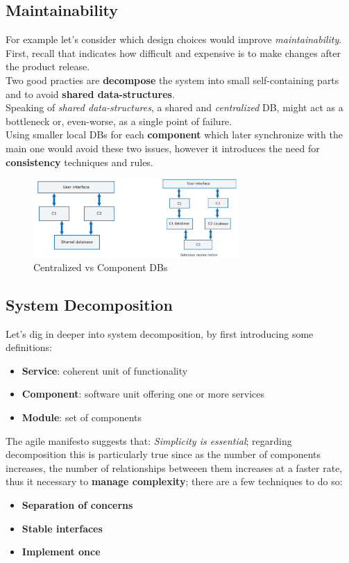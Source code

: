 \subsection{Maintainability}
For example let's consider which design choices would improve \textit{maintainability}.
First, recall that indicates how difficult and expensive is to make changes after the product release.\\
Two good practies are \textbf{decompose} the system into small self-containing parts and to avoid \textbf{shared data-structures}.\\
Speaking of \textit{shared data-structures},
a shared and \textit{centralized} DB, might act as a bottleneck or, even-worse,
as a single point of failure.\\
Using smaller local DBs for each \textbf{component} which later synchronize with the main one would avoid these two issues,
however it introduces the need for \textbf{consistency} techniques and rules.
\begin{figure}[ht]
    \centering
    \includegraphics[width=0.7\textwidth]{images/component_DBs.png}
    \caption{Centralized vs Component DBs}
\end{figure}

\subsection{System Decomposition}
Let's dig in deeper into system decomposition, by first introducing some definitions:
\begin{itemize}
    \item \textbf{Service}: coherent unit of functionality
    \item \textbf{Component}: software unit offering one or more services
    \item \textbf{Module}: set of components
\end{itemize}
The agile manifesto suggests that: \textit{Simplicity is essential};
regarding decomposition this is particularly true since as the number of components increases,
the number of relationships betweeen them increases at a faster rate,
thus it necessary to \textbf{manage complexity};
there are a few techniques to do so:
\begin{itemize}
    \item \textbf{Separation of concerns}
    \item \textbf{Stable interfaces}
    \item \textbf{Implement once}
\end{itemize}

